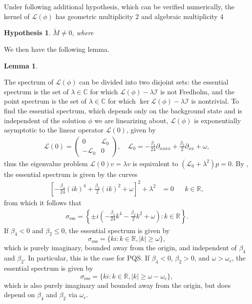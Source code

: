 \documentclass[12pt]{elsarticle}
\def\R{{\mathbb R}}
\def\C{{\mathbb C}}
\def\calL{{\mathcal L}}
\def\calI{{\mathcal I}}
\newtheorem{lemma}{Lemma}
\newtheorem{hypothesis}{Hypothesis}
\begin{document}
Under following additional hypothesis, which can be verified numerically, the kernel of $\calL(\phi)$ has geometric multiplicity 2 and algebraic multiplicity 4

\begin{hypothesis}$\tilde{M} \neq 0$, where 
\end{hypothesis}

We then have the following lemma.

\begin{lemma}\label{lemma:Lphikernel}
\end{lemma}

The spectrum of $\calL(\phi)$ can be divided into two disjoint sets: the essential spectrum is the set of $\lambda \in \C$ for which $\calL(\phi) - \lambda \calI$ is not Fredholm, and the point spectrum is the set of $\lambda \in \C$ for which $\ker \calL(\phi) - \lambda \calI$ is nontrivial. To find the essential spectrum, which depends only on the background state and is independent of the solution $\phi$ we are linearizing about, $\calL(\phi)$ is exponentially asymptotic to the linear operator $\calL(0)$, given by
\begin{align}\label{defL0}
\calL(0) = 
\begin{pmatrix}
0 & \calL_0 \\
-\calL_0 & 0
\end{pmatrix}, \quad
\calL_0 = -\frac{\beta_4}{24} \partial_{xxxx} + \frac{\beta_2}{2} \partial_{xx} + \omega,
\end{align}
thus the eigenvalue problem $\calL(0) v = \lambda v$ is equivalent to $(\calL_0 + \lambda^2)p = 0$. By \cite[Theorem 3.1.13]{Kapitula2013}, the essential spectrum is given by the curves
\begin{align*}
\left[ -\frac{\beta_4}{24} (ik)^4 + \frac{\beta_2}{2}(ik)^2 + \omega \right]^2 + \lambda^2 &= 0 && k \in \R,
\end{align*}
from which it follows that
\begin{align*}
\sigma_{\text{ess}} = \left\{ \pm i \left( -\frac{\beta_4}{24}k^4 - \frac{\beta_2}{2}k^2 + \omega \right) : k \in \R \right\}.
\end{align*}
If $\beta_4 < 0$ and $\beta_2 \leq 0$, the essential spectrum is given by 
\begin{equation}\label{PQSessspec}
\sigma_{\text{ess}} = \{ k i : k \in \R, |k| \geq \omega \},
\end{equation}
which is purely imaginary, bounded away from the origin, and independent of $\beta_4$ and $\beta_2$. In particular, this is the case for PQS. If $\beta_4 < 0$, $\beta_2 > 0$, and $\omega > \omega_c$, the essential spectrum is given by 
\begin{equation}\label{essspec2}
\sigma_{\text{ess}} = \{ k i : k \in \R, |k| \geq \omega - \omega_c \},
\end{equation}
which is also purely imaginary and bounded away from the origin, but does depend on $\beta_4$ and $\beta_2$ via $\omega_c$.
\end{document}

